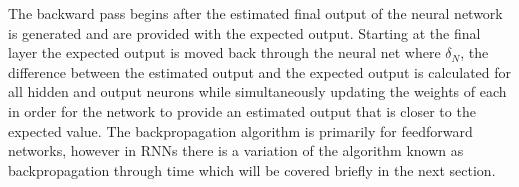 The backward pass begins after the estimated final output of the neural network is generated and are provided with the expected output. Starting at the final layer the expected output is moved back through the neural net where  $\delta_N$, the difference between the estimated output and the expected output is calculated for all hidden and output neurons while simultaneously updating the weights of each in order for the network to provide an estimated output that is closer to the expected value. \cite{nielsen_1970}
\cite{guo2013backpropagation} \cite{hecht1988theory}
The backpropagation algorithm is primarily for feedforward networks, however in RNNs there is a variation of the algorithm known as backpropagation through time which will be covered briefly in the next section.


\vspace{1.5\baselineskip}
